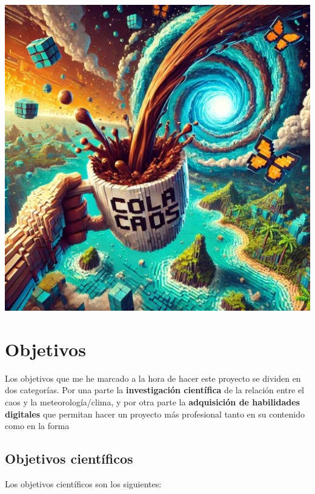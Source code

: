 \documentclass[
  10pt,
  a4paper,
  DIV=11,
  numbers=noendperiod,
  open=any]{scrreprt}
\numberwithin{equation}{chapter}
\numberwithin{equation}{chapter}
\renewcommand{\[}{\begin{equation}}
\renewcommand{\]}{\end{equation}}
\begin{document}
\begin{center}
\includegraphics[width=0.6\linewidth,height=\textheight,keepaspectratio]{colacaos.jpeg}
\end{center}


\chapter{Objetivos}\label{objetivos}

Los objetivos que me he marcado a la hora de hacer este proyecto se
dividen en dos categorías. Por una parte la \textbf{investigación
científica} de la relación entre el caos y la meteorología/clima, y por
otra parte la \textbf{adquisición de habilidades digitales} que permitan
hacer un proyecto más profesional tanto en su contenido como en la forma

\section{Objetivos científicos}\label{objetivos-cientuxedficos}

Los objetivos científicos son los siguientes:
\end{document}
